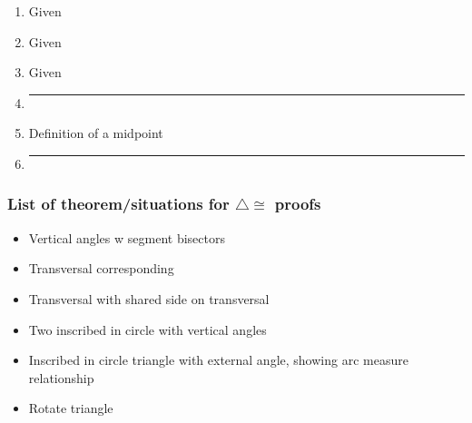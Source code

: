 \begin{enumerate}
\begin{multicols}{2}
\begin{enumerate}[label={\arabic*)}]
     \item Given \vspace{0.3cm}
     \item Given \vspace{0.3cm}
     \item Given \vspace{0.3cm}
     \item \rule{4cm}{0.15mm} \vspace{0.3cm}
     \item Definition of a midpoint \vspace{0.3cm}
     \item \rule{4cm}{0.15mm} \vspace{0.3cm}
   \end{enumerate}
 \end{multicols} %

 \subsubsection*{List of theorem/situations for $\triangle \cong$ proofs}
 \begin{itemize}
  \item Vertical angles w segment bisectors
  \item Transversal corresponding
  \item Transversal with shared side on transversal
  \item Two inscribed in circle with vertical angles
  \item Inscribed in circle triangle with external angle, showing arc measure relationship
  \item Rotate triangle
 \end{itemize}
  

\end{enumerate}
